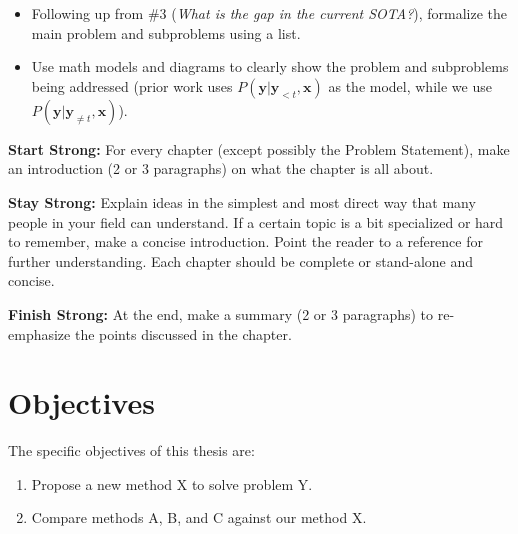 \label{ch:problem-statement}

\begin{itemize}
    \item Following up from \#3 (\emph{What is the gap in the current SOTA?}), formalize the main problem and subproblems using a list.
    \item Use math models and diagrams to clearly show the problem and subproblems being addressed (\eg prior work uses $P(\mathbf{y} | \mathbf{y}_{<t}, \mathbf{x})$ as the model, while we use $P(\mathbf{y} | \mathbf{y}_{\neq t}, \mathbf{x})$).
\end{itemize}

\textbf{Start Strong:} For every chapter (except possibly the Problem Statement), make an introduction (2 or 3 paragraphs) on what the chapter is all about.

\textbf{Stay Strong:} Explain ideas in the simplest and most direct way that many people in your field can understand. If a certain topic is a bit specialized or hard to remember, make a concise introduction. Point the reader to a reference for further understanding. Each chapter should be complete or stand-alone and concise.

\textbf{Finish Strong:} At the end, make a summary (2 or 3 paragraphs) to re-emphasize the points discussed in the chapter.

\section{Objectives}

The specific objectives of this thesis are:
\begin{enumerate}
    \item Propose a new method X to solve problem Y.
    \item Compare methods A, B, and C against our method X.
\end{enumerate}
